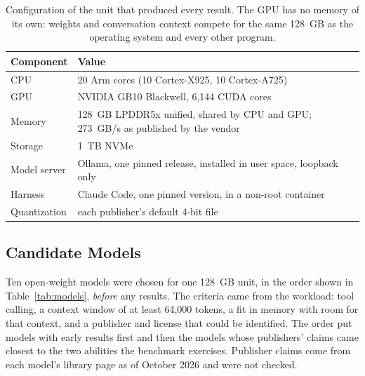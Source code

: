 \documentclass[11pt]{article}
\begin{document}
\begin{table}[htbp]
\centering
\small
\begin{tabular}{@{}lp{12cm}@{}}
\toprule
\textbf{Component} & \textbf{Value} \\
\midrule
CPU & 20 Arm cores (10 Cortex-X925, 10 Cortex-A725) \\
GPU & NVIDIA GB10 Blackwell, 6,144 CUDA cores \\
Memory & 128~GB LPDDR5x unified, shared by CPU and GPU; 273~GB/s as published by the vendor \cite{nvidia2025dgxspark} \\
Storage & 1~TB NVMe \\
Model server & Ollama, one pinned release, installed in user space, loopback only \\
Harness & Claude Code, one pinned version, in a non-root container \\
Quantization & each publisher's default 4-bit file \\
\bottomrule
\end{tabular}
\caption{Configuration of the unit that produced every result. The GPU has no memory of its own: weights and conversation context compete for the same 128~GB as the operating system and every other program.}
\label{tab:hardware}
\end{table}

\subsection{Candidate Models}

Ten open-weight models were chosen for one 128~GB unit, in the order shown in Table~\ref{tab:models}, \textit{before} any results. The criteria came from the workload: tool calling, a context window of at least 64,000 tokens, a fit in memory with room for that context, and a publisher and license that could be identified. The order put models with early results first and then the models whose publishers' claims came closest to the two abilities the benchmark exercises. Publisher claims come from each model's library page as of October 2026 and were not checked.
\end{document}
